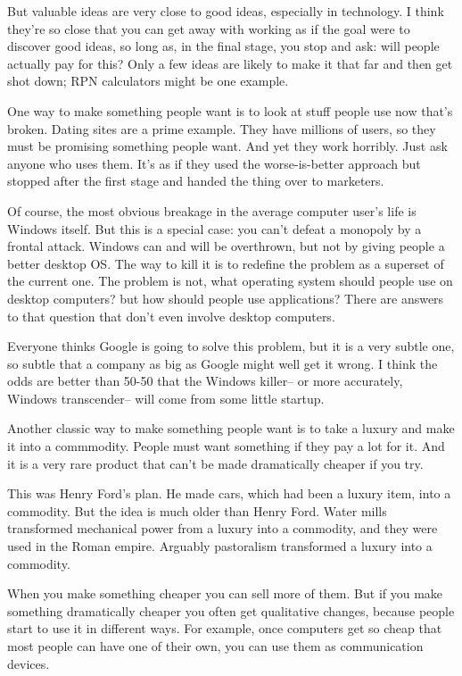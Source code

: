 But valuable ideas are very close to good ideas, especially in
technology. I think they're so close that you can get away with working
as if the goal were to discover good ideas, so long as, in the final
stage, you stop and ask: will people actually pay for this? Only a few
ideas are likely to make it that far and then get shot down; RPN
calculators might be one example.

One way to make something people want is to look at stuff people use now
that's broken. Dating sites are a prime example. They have millions of
users, so they must be promising something people want. And yet they
work horribly. Just ask anyone who uses them. It's as if they used the
worse-is-better approach but stopped after the first stage and handed
the thing over to marketers.

Of course, the most obvious breakage in the average computer user's life
is Windows itself. But this is a special case: you can't defeat a
monopoly by a frontal attack. Windows can and will be overthrown, but
not by giving people a better desktop OS. The way to kill it is to
redefine the problem as a superset of the current one. The problem is
not, what operating system should people use on desktop computers? but
how should people use applications? There are answers to that question
that don't even involve desktop computers.

Everyone thinks Google is going to solve this problem, but it is a very
subtle one, so subtle that a company as big as Google might well get it
wrong. I think the odds are better than 50-50 that the Windows killer--
or more accurately, Windows transcender-- will come from some little
startup.

Another classic way to make something people want is to take a luxury
and make it into a commmodity. People must want something if they pay a
lot for it. And it is a very rare product that can't be made
dramatically cheaper if you try.

This was Henry Ford's plan. He made cars, which had been a luxury item,
into a commodity. But the idea is much older than Henry Ford. Water
mills transformed mechanical power from a luxury into a commodity, and
they were used in the Roman empire. Arguably pastoralism transformed a
luxury into a commodity.

When you make something cheaper you can sell more of them. But if you
make something dramatically cheaper you often get qualitative changes,
because people start to use it in different ways. For example, once
computers get so cheap that most people can have one of their own, you
can use them as communication devices.

